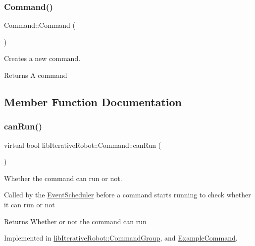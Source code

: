 \subsubsection{\texorpdfstring{Command()}{Command()}}
{\footnotesize\ttfamily Command\+::\+Command (\begin{DoxyParamCaption}{ }\end{DoxyParamCaption})}



Creates a new command. 

\begin{DoxyReturn}{Returns}
A command 
\end{DoxyReturn}


\subsection{Member Function Documentation}
\mbox{\label{classlib_iterative_robot_1_1_command_aebef0fdf029a15ee48fbb778c4265609}} 
\subsubsection{\texorpdfstring{canRun()}{canRun()}}
{\footnotesize\ttfamily virtual bool lib\+Iterative\+Robot\+::\+Command\+::can\+Run (\begin{DoxyParamCaption}{ }\end{DoxyParamCaption})\hspace{0.3cm}{\ttfamily [pure virtual]}}



Whether the command can run or not. 

Called by the \mbox{\hyperlink{classlib_iterative_robot_1_1_event_scheduler}{Event\+Scheduler}} before a command starts running to check whether it can run or not \begin{DoxyReturn}{Returns}
Whether or not the command can run 
\end{DoxyReturn}


Implemented in \mbox{\hyperlink{classlib_iterative_robot_1_1_command_group_abd75c9b52e6b4ae5af1b6724e865311f}{lib\+Iterative\+Robot\+::\+Command\+Group}}, and \mbox{\hyperlink{class_example_command_ad1df0170d99bcef6c6bc1676551f9539}{Example\+Command}}.

\mbox{\label{classlib_iterative_robot_1_1_command_a447ba6e394f165c6d358471a8bbdc76a}} 
